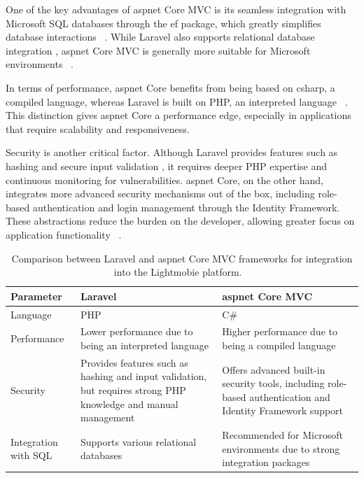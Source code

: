 One of the key advantages of \ac{aspnet} Core \ac{MVC} is its seamless integration with Microsoft \ac{SQL} databases through the \ac{ef} package, which greatly simplifies database interactions ~\cite{Mezei_2023}. While Laravel also supports relational database integration \cite{Sinha_2016}, \ac{aspnet} Core \ac{MVC} is generally more suitable for Microsoft environments ~\cite{asp_net_vs_laravel}.

In terms of performance, \ac{aspnet} Core benefits from being based on \ac{csharp}, a compiled language, whereas Laravel is built on \ac{PHP}, an interpreted language ~\cite{Yang_2023}. This distinction gives \ac{aspnet} Core a performance edge, especially in applications that require scalability and responsiveness.

Security is another critical factor. Although Laravel provides features such as hashing and secure input validation \cite{Mary__2021} , it requires deeper \ac{PHP} expertise and continuous monitoring for vulnerabilities. \ac{aspnet} Core, on the other hand, integrates more advanced security mechanisms out of the box, including role-based authentication and login management through the Identity Framework. These abstractions reduce the burden on the developer, allowing greater focus on application functionality ~\cite{asp_net_vs_laravel}.

\begin{table}[]
\begin{tabular}{| m{5em} | m{15em} | m{15em} |}
\hline
Parameter & Laravel & \ac{aspnet} Core \ac{MVC} \\
\hline
Language & \ac{PHP} & C\# \\
\hline
Performance & Lower performance due to being an interpreted language & Higher performance due to being a compiled language \\
\hline 
Security & Provides features such as hashing and input validation, but requires strong \ac{PHP} knowledge and manual management & Offers advanced built-in security tools, including role-based authentication and Identity Framework support \\
\hline
Integration with \ac{SQL} & Supports various relational databases & Recommended for Microsoft environments due to strong integration packages \\
\hline
\end{tabular}
\caption{Comparison between Laravel and \ac{aspnet} Core \ac{MVC} frameworks for integration into the Lightmobie platform. ~\cite{asp_net_vs_laravel} }
\label{table:architetcture_comparison}
\end{table}
 
